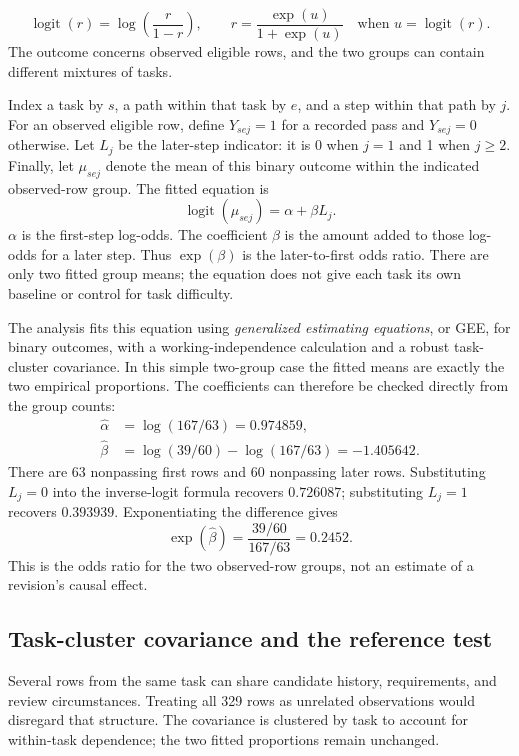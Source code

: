 \[
\operatorname{logit}(r)=\log\left(\frac{r}{1-r}\right),
\qquad
r=\frac{\exp(u)}{1+\exp(u)}\quad\text{when }u=\operatorname{logit}(r).
\]
The outcome concerns observed eligible rows, and the two groups can contain different mixtures of tasks.

Index a task by $s$, a path within that task by $e$, and a step within that path by $j$. For an observed eligible row, define $Y_{sej}=1$ for a recorded pass and $Y_{sej}=0$ otherwise. Let $L_j$ be the later-step indicator: it is 0 when $j=1$ and 1 when $j\ge2$. Finally, let $\mu_{sej}$ denote the mean of this binary outcome within the indicated observed-row group. The fitted equation is
\begin{equation}
 \operatorname{logit}(\mu_{sej})=\alpha+\beta L_j.
 \label{eq:process-two-group-model}
\end{equation}
$\alpha$ is the first-step log-odds. The coefficient $\beta$ is the amount added to those log-odds for a later step. Thus $\exp(\beta)$ is the later-to-first odds ratio. There are only two fitted group means; the equation does not give each task its own baseline or control for task difficulty.

The analysis fits this equation using \emph{generalized estimating equations}, or GEE, for binary outcomes, with a working-independence calculation and a robust task-cluster covariance.\cite{statsmodelsgee} In this simple two-group case the fitted means are exactly the two empirical proportions. The coefficients can therefore be checked directly from the group counts:
\begin{align*}
 \widehat\alpha&=\log(167/63)=0.974859,\\
 \widehat\beta&=\log(39/60)-\log(167/63)=-1.405642.
\end{align*}
There are 63 nonpassing first rows and 60 nonpassing later rows. Substituting $L_j=0$ into the inverse-logit formula recovers $0.726087$; substituting $L_j=1$ recovers $0.393939$. Exponentiating the difference gives
\[
\exp(\widehat\beta)=\frac{39/60}{167/63}=0.2452.
\]
This is the odds ratio for the two observed-row groups, not an estimate of a revision's causal effect.

\subsection{Task-cluster covariance and the reference test}
\label{subsec:robust-covariance}
Several rows from the same task can share candidate history, requirements, and review circumstances. Treating all 329 rows as unrelated observations would disregard that structure. The covariance is clustered by task to account for within-task dependence; the two fitted proportions remain unchanged.

